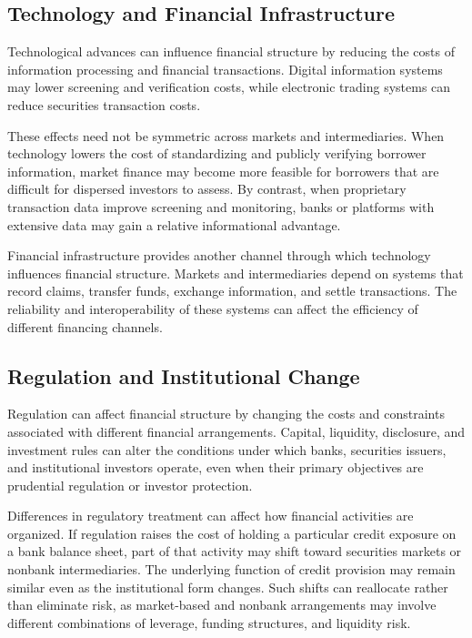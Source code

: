 \subsection{Technology and Financial Infrastructure}

Technological advances can influence financial structure by reducing the costs of information processing and financial transactions. Digital information systems may lower screening and verification costs, while electronic trading systems can reduce securities transaction costs.

These effects need not be symmetric across markets and intermediaries. When technology lowers the cost of standardizing and publicly verifying borrower information, market finance may become more feasible for borrowers that are difficult for dispersed investors to assess. By contrast, when proprietary transaction data improve screening and monitoring, banks or platforms with extensive data may gain a relative informational advantage.

Financial infrastructure provides another channel through which technology influences financial structure. Markets and intermediaries depend on systems that record claims, transfer funds, exchange information, and settle transactions. The reliability and interoperability of these systems can affect the efficiency of different financing channels.


\subsection{Regulation and Institutional Change}

Regulation can affect financial structure by changing the costs and constraints associated with different financial arrangements. Capital, liquidity, disclosure, and investment rules can alter the conditions under which banks, securities issuers, and institutional investors operate, even when their primary objectives are prudential regulation or investor protection.

Differences in regulatory treatment can affect how financial activities are organized. If regulation raises the cost of holding a particular credit exposure on a bank balance sheet, part of that activity may shift toward securities markets or nonbank intermediaries. The underlying function of credit provision may remain similar even as the institutional form changes. Such shifts can reallocate rather than eliminate risk, as market-based and nonbank arrangements may involve different combinations of leverage, funding structures, and liquidity risk.

